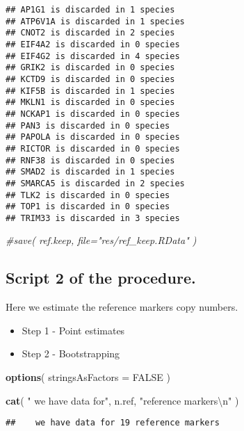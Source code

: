\documentclass[]{article}
\newenvironment{Shaded}{\begin{snugshade}}{\end{snugshade}}
\newcommand{\KeywordTok}[1]{\textcolor[rgb]{0.13,0.29,0.53}{\textbf{#1}}}
\newcommand{\DataTypeTok}[1]{\textcolor[rgb]{0.13,0.29,0.53}{#1}}
\newcommand{\CharTok}[1]{\textcolor[rgb]{0.31,0.60,0.02}{#1}}
\newcommand{\StringTok}[1]{\textcolor[rgb]{0.31,0.60,0.02}{#1}}
\newcommand{\CommentTok}[1]{\textcolor[rgb]{0.56,0.35,0.01}{\textit{#1}}}
\newcommand{\OtherTok}[1]{\textcolor[rgb]{0.56,0.35,0.01}{#1}}
\newcommand{\NormalTok}[1]{#1}
\providecommand{\tightlist}{%
  \setlength{\itemsep}{0pt}\setlength{\parskip}{0pt}}
\begin{document}
\begin{verbatim}
## AP1G1 is discarded in 1 species
## ATP6V1A is discarded in 1 species
## CNOT2 is discarded in 2 species
## EIF4A2 is discarded in 0 species
## EIF4G2 is discarded in 4 species
## GRIK2 is discarded in 0 species
## KCTD9 is discarded in 0 species
## KIF5B is discarded in 1 species
## MKLN1 is discarded in 0 species
## NCKAP1 is discarded in 0 species
## PAN3 is discarded in 0 species
## PAPOLA is discarded in 0 species
## RICTOR is discarded in 0 species
## RNF38 is discarded in 0 species
## SMAD2 is discarded in 1 species
## SMARCA5 is discarded in 2 species
## TLK2 is discarded in 0 species
## TOP1 is discarded in 0 species
## TRIM33 is discarded in 3 species
\end{verbatim}

\begin{Shaded}
\begin{Highlighting}[]
\CommentTok{#save( ref.keep, file="res/ref_keep.RData" )}
\end{Highlighting}
\end{Shaded}

\subsection{Script 2 of the
procedure.}\label{script-2-of-the-procedure.}

Here we estimate the reference markers copy numbers.

\begin{itemize}
\tightlist
\item
  Step 1 - Point estimates
\item
  Step 2 - Bootstrapping
\end{itemize}

\begin{Shaded}
\begin{Highlighting}[]
\KeywordTok{options}\NormalTok{( }\DataTypeTok{stringsAsFactors =} \OtherTok{FALSE}\NormalTok{ )}

\KeywordTok{cat}\NormalTok{( }\StringTok{"   we have data for"}\NormalTok{, n.ref, }\StringTok{"reference markers}\CharTok{\textbackslash{}n}\StringTok{"}\NormalTok{ )}
\end{Highlighting}
\end{Shaded}

\begin{verbatim}
##    we have data for 19 reference markers
\end{verbatim}
\end{document}
